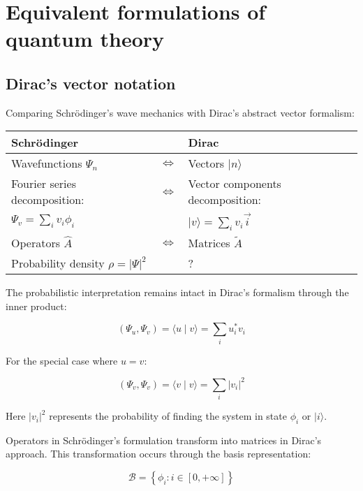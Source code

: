 \documentclass[italian]{HKNdocument}
\begin{document}
\section{Equivalent formulations of quantum theory}
\subsection{Dirac's vector notation}

Comparing Schrödinger's wave mechanics with Dirac's abstract vector formalism:

\begin{center}
\begin{tabular}{|l|l|l|}
\hline
Schrödinger &  & Dirac \\
\hline
Wavefunctions $\Psi_{n}$ & $\Longleftrightarrow$ & Vectors $|n\rangle$ \\
\hline
Fourier series decomposition: & $\Longleftrightarrow$ & Vector components decomposition: \\
\hline
$\Psi_{v}=\sum_{i} v_{i} \phi_{i}$ &  & $|v\rangle=\sum_{i} v_{i} \vec{i}$ \\
\hline
Operators $\hat{A}$ & $\Longleftrightarrow$ & Matrices $\tilde{A}$ \\
\hline
Probability density $\rho=|\Psi|^{2}$ &  & ? \\
\hline
\end{tabular}
\end{center}

The probabilistic interpretation remains intact in Dirac's formalism through the inner product:

\begin{equation}
\left(\Psi_{u}, \Psi_{v}\right)=\langle u \mid v\rangle=\sum_{i} u_{i}^{*} v_{i}
\end{equation}

For the special case where $u=v$:

\begin{equation}
\left(\Psi_{v}, \Psi_{v}\right)=\langle v \mid v\rangle=\sum_{i}\left|v_{i}\right|^{2}
\end{equation}

Here $\left|v_{i}\right|^{2}$ represents the probability of finding the system in state $\phi_{i}$ or $|i\rangle$.

Operators in Schrödinger's formulation transform into matrices in Dirac's approach. This transformation occurs through the basis representation:

\begin{equation}
\mathcal{B}=\left\{\phi_{i}: i \in[0,+\infty]\right\}
\end{equation}
\end{document}
